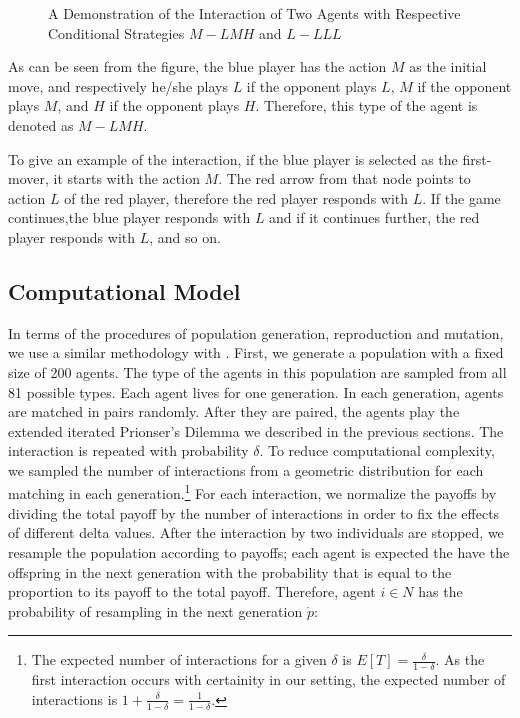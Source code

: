 \documentclass[12pt]{article}
\begin{document}
	\begin{figure}[H]
\centering

		\caption[Demonstration of Interacting Agents]{A Demonstration of the Interaction of Two Agents with Respective Conditional Strategies $M-LMH$ and $L-LLL$}
\label{fig:evo-stategies}
	\end{figure}

As can be seen from the figure, the blue player has the action $M$ as the initial move, and respectively he/she plays $L$ if the opponent plays $L$, $M$ if the opponent plays $M$, and $H$ if the opponent plays $H$. Therefore, this type of the agent is denoted as $M-LMH$. 

To give an example of the interaction, if the blue player is selected as the first-mover, it starts with the action $M$. The red arrow from that node points to action $L$ of the red player, therefore the red player responds with $L$. If the game continues,the blue player responds with $L$ and if it continues further, the red player responds with $L$, and so on. 

\subsection{Computational Model}

In terms of the procedures of population generation, reproduction and mutation, we use a similar methodology with \citet{Van_Veelen2012-xf}. First, we generate a population with a fixed size of 200 agents. The type of the agents in this population are sampled from all 81 possible types. Each agent lives for one generation. In each generation, agents are matched in pairs randomly. After they are paired, the agents play the extended iterated Prionser's Dilemma we described in the previous sections. The interaction is repeated with probability $\delta$. To reduce computational complexity, we sampled the number of interactions from a geometric distribution for each matching in each generation.\footnote{The expected number of interactions for a given $\delta$ is $E[T] = \frac{\delta}{1-\delta}$. As the first interaction occurs with certainity in our setting, the expected number of interactions is $1 +\frac{\delta}{1-\delta} = \frac{1}{1-\delta}.$} For each interaction, we normalize the payoffs by dividing the total payoff by the number of interactions in order to fix the effects of different delta values. After the interaction by two individuals are stopped, we resample the population according to payoffs; each agent is expected the have the offspring in the next generation with the probability that is equal to the proportion to its payoff to the total payoff. Therefore, agent $i \in N$ has the probability of resampling in the next generation $\dot{p}$:
\end{document}
